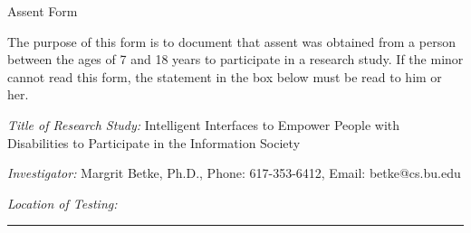 \setlength{\textheight}{9.75in}
\setlength{\footheight}{0.0in}
\setlength{\topmargin}{-0.25in}   %
\setlength{\headheight}{0.0in}
\setlength{\headsep}{0.0in}
\setlength{\textwidth}{6.6in}
\setlength{\oddsidemargin}{0in}
\setlength{\parindent}{0pc}
\setlength{\parskip}{6pt plus 1.5pt minus 1.5pt}


\signature{\vspace*{-.9cm} Margrit Betke,\\ Associate Professor}


\pagestyle{empty}

\begin{letter}

\centerline{\Large Assent Form}

The purpose of this form is to document that assent was obtained from
a person between the ages of 7 and 18 years to participate in a
research study.  If the minor cannot read this form, the statement in
the box below must be read to him or her.

{\em Title of Research Study:}
Intelligent Interfaces to Empower People with Disabilities to
Participate in the Information Society


{\em Investigator:} Margrit Betke, Ph.D., Phone: 617-353-6412, Email:
betke@cs.bu.edu


{\em Location of Testing:}  \rule{3cm}{.01cm}


\begin{center}
\end{center}
\end{letter}
